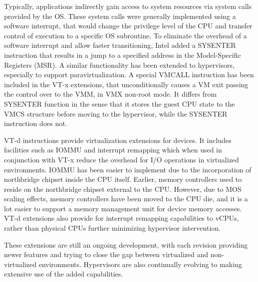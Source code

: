 Typically, applications indirectly gain access to system resources via system calls provided by the OS. These system calls were generally implemented using a software interrupt, that would change the privilege level of the CPU and transfer control of execution to a specific OS subroutine. To eliminate the overhead of a software interrupt and allow faster transitioning, Intel added a SYSENTER instruction that results in a jump to a specified address in the Model-Specific Registers (MSR). A similar functionality has been extended to hypervisors, especially to support paravirtualization. A special VMCALL instruction has been included in the VT-x extensions, that unconditionally causes a VM exit passing the control over to the VMM, in VMX non-root mode. It differs from SYSENTER function in the sense that it stores the guest CPU state to the VMCS structure before moving to the hypervisor, while the SYSENTER instruction does not.

VT-d instructions provide virtualization extensions for devices. It includes facilities such as IOMMU and interrupt remapping which when used in conjunction with VT-x reduce the overhead for I/O operations in virtualized environments. IOMMU has been easier to implement due to the incorporation of northbridge chipset inside the CPU itself. Earlier, memory controllers used to reside on the northbridge chipset external to the CPU. However, due to MOS scaling effects, memory controllers have been moved to the CPU die, and it is a lot easier to support a memory management unit for device memory accesses. VT-d extensions also provide for interrupt remapping capabilities to vCPUs, rather than physical CPUs further minimizing hypervisor intervention.

These extensions are still an ongoing development, with each revision providing newer features and trying to close the gap between virtualized and non-virtualized environments. Hypervisors are also continually evolving to making extensive use of the added capabilities. 
